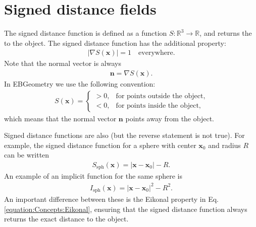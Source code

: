 \documentclass[letterpaper,10pt,english]{sphinxmanual}
\begin{document}
\section{Signed distance fields}
\label{\detokenize{Concepts:signed-distance-fields}}\label{\detokenize{Concepts:chap-concepts}}\label{\detokenize{Concepts::doc}}
\sphinxAtStartPar
The signed distance function is defined as a function \(S: \mathbb{R}^3 \rightarrow \mathbb{R}\), and returns the  to the object.
The signed distance function has the additional property:
\begin{equation}\label{equation:Concepts:Eikonal}
\begin{split}\left|\nabla S(\mathbf{x})\right| = 1 \quad\textrm{everywhere}.\end{split}
\end{equation}
\sphinxAtStartPar
Note that the normal vector is always
\begin{equation*}
\begin{split}\mathbf{n} = \nabla S\left(\mathbf{x}\right).\end{split}
\end{equation*}
\sphinxAtStartPar
In EBGeometry we use the following convention:
\begin{equation*}
\begin{split}S(\mathbf{x}) =
\begin{cases}
> 0, & \textrm{for points outside the object}, \\
< 0, & \textrm{for points inside the object},
\end{cases}\end{split}
\end{equation*}
\sphinxAtStartPar
which means that the normal vector \(\mathbf{n}\) points away from the object.

\sphinxAtStartPar
Signed distance functions are also  (but the reverse statement is not true).
For example, the signed distance function for a sphere with center \(\mathbf{x}_0\) and radius \(R\) can be written
\begin{equation*}
\begin{split}S_{\textrm{sph}}\left(\mathbf{x}\right) = \left|\mathbf{x} - \mathbf{x}_0\right| - R.\end{split}
\end{equation*}
\sphinxAtStartPar
An example of an implicit function for the same sphere is
\begin{equation*}
\begin{split}I_{\textrm{sph}}\left(\mathbf{x}\right) = \left|\mathbf{x} - \mathbf{x}_0\right|^2 - R^2.\end{split}
\end{equation*}
\sphinxAtStartPar
An important difference between these is the Eikonal property in Eq. \ref{equation:Concepts:Eikonal}, ensuring that the signed distance function always returns the exact distance to the object.
\end{document}
